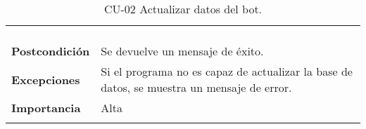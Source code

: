\begin{longtable}[H]{@{}ll@{}}
\begin{minipage}[t]{0.71\columnwidth}
\begin{enumerate}
		\end{enumerate}\strut
	\end{minipage}\tabularnewline
	\begin{minipage}[t]{0.23\columnwidth}\raggedright\strut
		\textbf{Postcondición}\strut
	\end{minipage} & \begin{minipage}[t]{0.71\columnwidth}\raggedright\strut
		Se devuelve un mensaje de éxito.\strut
	\end{minipage}\tabularnewline
	\begin{minipage}[t]{0.23\columnwidth}\raggedright\strut
		\textbf{Excepciones}\strut
	\end{minipage} & \begin{minipage}[t]{0.71\columnwidth}\raggedright\strut
		Si el programa no es capaz de actualizar la base de datos, se muestra un mensaje de error.\strut
	\end{minipage}\tabularnewline
	\begin{minipage}[t]{0.23\columnwidth}\raggedright\strut
		\textbf{Importancia}\strut
	\end{minipage} & \begin{minipage}[t]{0.71\columnwidth}\raggedright\strut
		Alta\strut
	\end{minipage}\tabularnewline
	\bottomrule
	\caption{CU-02 Actualizar datos del bot.}
\end{longtable}


